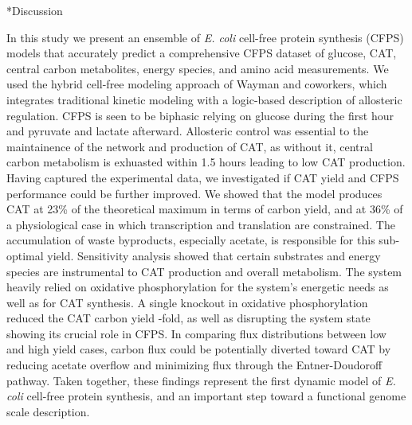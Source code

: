 \documentclass[12pt]{article}
\makeatletter
\renewcommand\section{\@startsection
	{subsection}{2}{0mm}
	{-0.2in}
	{0.05\baselineskip}
	{\normalfont\large\bfseries}}
\makeatother
\begin{document}
\clearpage

\section*{Discussion}


In this study we present an ensemble of \textit{E. coli} cell-free protein synthesis (CFPS) models that accurately predict a comprehensive CFPS dataset of glucose, CAT, central carbon metabolites, energy species, and amino acid measurements.
We used the hybrid cell-free modeling approach of Wayman and coworkers, which integrates traditional kinetic modeling with a logic-based description of allosteric regulation.
CFPS is seen to be biphasic relying on glucose during the first hour and pyruvate and lactate afterward. 
Allosteric control was essential to the maintainence of the network and production of CAT, as without it, central carbon metabolism is exhuasted within 1.5 hours leading to low CAT production.
Having captured the experimental data, we investigated if CAT yield and CFPS performance could be further improved. 
We showed that the model produces CAT at 23\% of the theoretical maximum in terms of carbon yield, and at 36\% of a physiological case in which transcription and translation are constrained.
The accumulation of waste byproducts, especially acetate, is responsible for this sub-optimal yield. 
Sensitivity analysis showed that certain substrates and energy species are instrumental to CAT production and overall metabolism. 
The system heavily relied on oxidative phosphorylation for the system's energetic needs as well as for CAT synthesis.
A single knockout in oxidative phosphorylation reduced the CAT carbon yield -fold, as well as disrupting the system state showing its crucial role in CFPS. 
In comparing flux distributions between low and high yield cases, carbon flux could be potentially diverted toward CAT by reducing acetate overflow and minimizing flux through the Entner-Doudoroff pathway.
Taken together, these findings represent the first dynamic model of \textit{E. coli} cell-free protein synthesis, and an important step toward a functional genome scale description.
\end{document}

